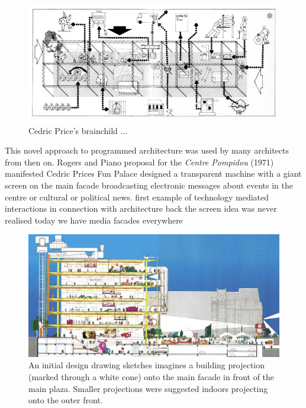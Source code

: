 \begin{figure} [h!]
    \centering
        \includegraphics[width=\textwidth]{Illustrations/fun_palace.png}
    \caption[Fun Palace, (1961)]{Cedric Price's brainchild ... }
    \label{fun_palace}
\end{figure}


This novel approach to programmed architecture was used by many architects from then on.
Rogers and Piano proposal for the \textit{Centre Pompidou} (1971)  manifested Cedric Prices Fun Palace 
designed a transparent machine with a giant screen on the main facade broadcasting electronic messages about events in the centre or cultural or political news.
first example of technology mediated interactions in connection with architecture
back the screen idea was never realised
today we have media facades everywhere


\begin{figure} [h!]
    \centering
        \includegraphics[width=\textwidth]{Illustrations/centre_pompidou.jpg}
    \caption[Centre Pompidou,(1971)]{An initial design drawing sketches imagines a building projection (marked through a white cone) onto the main facade in front of the main plaza. Smaller projections were suggested indoors projecting onto the outer front.}
    \label{centre_pompidou}
\end{figure}

